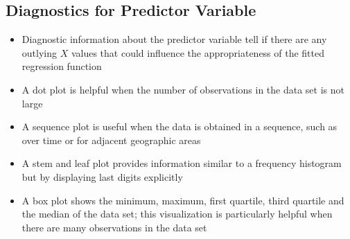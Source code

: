\subsection{Diagnostics for Predictor Variable}
\begin{itemize} 
\item Diagnostic information about the predictor variable tell if there are any outlying $X$ values that could influence the appropriateness of the fitted regression function 
\item A dot plot is helpful when the number of observations in the data set is not large 
\item A sequence plot is useful when the data is obtained in a sequence, such as over time or for adjacent geographic areas 
\item A stem and leaf plot provides information similar to a frequency histogram but by displaying last digits explicitly 
\item A box plot shows the minimum, maximum, first quartile, third quartile and the median of the data set; this visualization is particularly helpful when there are many observations in the data set 
\end{itemize} 

